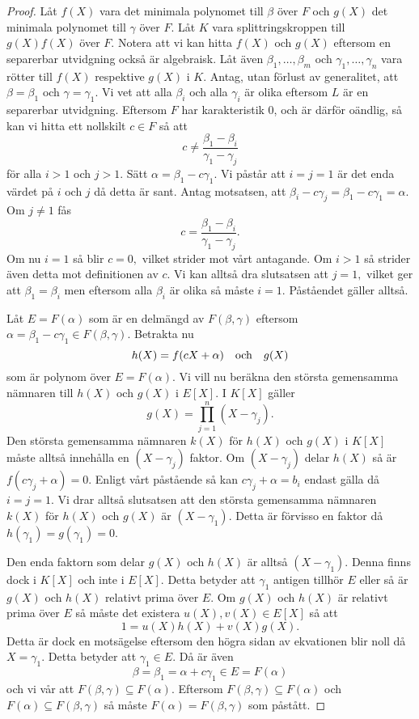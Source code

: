 \documentclass{article}
\theoremstyle{definition}
\begin{document}
\begin{proof}
  Låt $f(X)$ vara det minimala polynomet till $\beta$ över $F$ och $g(X)$ det minimala polynomet till $\gamma$ över $F$. Låt $K$ vara 
  splittringskroppen till $g(X)f(X)$ över $F$. Notera att vi kan hitta $f(X)$ och $g(X)$ eftersom en separerbar utvidgning också är algebraisk. 
  Låt även $\beta_1, \ldots, \beta_m$ och $\gamma_1, \ldots, \gamma_n$ vara rötter till $f(X)$ respektive $g(X)$ i $K$. Antag, 
  utan förlust av generalitet, att $\beta = \beta_1$ och $\gamma = \gamma_1.$ Vi vet att alla $\beta_i$ och alla $\gamma_i$ är olika 
  eftersom $L$ är en separerbar utvidgning. 
  Eftersom $F$ har karakteristik 0, och är därför oändlig, så kan vi 
  hitta ett nollskilt $c \in F$ så att 
  \[c \neq \frac{\beta_1 - \beta_i}{\gamma_1 - \gamma_j}\]
  för alla $i > 1$ och $j > 1.$ Sätt $\alpha = \beta_1 - c\gamma_1.$ Vi påstår att $i = j = 1$ är det enda värdet på $i$ och $j$ då detta är sant. 
  Antag motsatsen, att $\beta_i - c \gamma_j = \beta_1 - c\gamma_1 = \alpha.$ Om $j \neq 1$ fås
  \[ c = \frac{\beta_1 - \beta_i}{\gamma_1 - \gamma_j}. \]
  Om nu $i = 1$ så blir $c = 0,$ vilket strider mot vårt antagande. Om $i > 1$ så strider även detta mot definitionen av $c$. Vi kan alltså 
  dra slutsatsen att $j = 1,$ vilket ger att $\beta_1 = \beta_i$ men eftersom alla $\beta_i$ är olika så måste $i = 1.$ Påståendet gäller alltså.

  Låt $E = F(\alpha)$ som är en delmängd av $F(\beta, \gamma)$ eftersom $\alpha = \beta_1-c\gamma_1 \in F(\beta, \gamma).$
  Betrakta nu 
  \[h(X) = f(cX + \alpha) \quad \textnormal{och} \quad g(X)\]
  som är polynom över $E = F(\alpha)$. Vi vill nu beräkna den största gemensamma nämnaren till $h(X)$ och $g(X)$ i $E[X].$ I $K[X]$
  gäller
  \[ g(X) = \prod_{j = 1}^{n}(X-\gamma_j). \]
  Den största gemensamma nämnaren $k(X)$ för $h(X)$ och $g(X)$ i $K[X]$ måste alltså innehålla en $(X-\gamma_j)$ faktor. Om $(X - \gamma_j)$ delar 
  $h(X)$ så är $f(c\gamma_j + \alpha) = 0.$ Enligt vårt påstående så kan $c\gamma_j + \alpha = b_i$ endast gälla då $i = j = 1.$ Vi 
  drar alltså slutsatsen att den största gemensamma nämnaren $k(X)$ för $h(X)$ och $g(X)$ är $(X - \gamma_1)$. Detta är förvisso en faktor 
  då $h(\gamma_1) = g(\gamma_1) = 0.$ 

  Den enda faktorn som delar $g(X)$ och $h(X)$ är alltså $(X - \gamma_1)$. Denna finns dock i $K[X]$ och inte i $E[X]$. Detta betyder att 
  $\gamma_1$ antigen tillhör $E$ eller så är $g(X)$ och $h(X)$ relativt prima över $E$. Om $g(X)$ och $h(X)$ är relativt prima över $E$ så måste 
  det existera $u(X), v(X) \in E[X]$ så att
  \[1 = u(X)h(X) + v(X)g(X).\]
  Detta är dock en motsägelse eftersom den högra sidan av ekvationen blir noll då $X = \gamma_1.$ Detta betyder att $\gamma_1 \in E.$ Då är även 
  \[\beta = \beta_1 = \alpha + c\gamma_1 \in E = F(\alpha)\]
  och vi vår att $F(\beta, \gamma) \subseteq F(\alpha)$. Eftersom $F(\beta, \gamma) \subseteq F(\alpha)$ och $F(\alpha) \subseteq F(\beta, \gamma)$
  så måste $F(\alpha) = F(\beta, \gamma)$ som påstått.
\end{proof}
\end{document}
